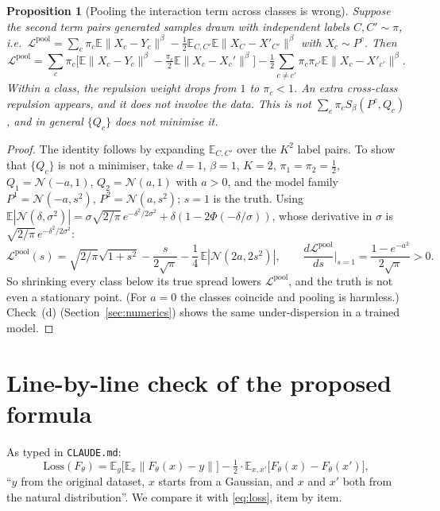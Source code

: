 \documentclass[11pt]{article}
\newtheorem{proposition}[theorem]{Proposition}
\theoremstyle{definition}
\theoremstyle{remark}
\newcommand{\E}{\mathbb{E}}
\newcommand{\N}{\mathcal{N}}
\newcommand{\norm}[1]{\lVert #1\rVert}
\newcommand{\Sb}{S_\beta}
\begin{document}
\begin{proposition}[Pooling the interaction term across classes is wrong]\label{prop:pool}
Suppose the second term pairs generated samples drawn with \emph{independent} labels $C,C'\sim\pi$, i.e.\
$\mathcal L^{\mathrm{pool}}=\sum_c\pi_c\E\norm{X_c-Y_c}^\beta-\tfrac12\E_{C,C'}\E\norm{X_C-X'_{C'}}^\beta$ with
$X_c\sim P^c$. Then
\[
\mathcal L^{\mathrm{pool}}=\sum_c\pi_c\Big[\E\norm{X_c-Y_c}^\beta-\tfrac{\pi_c}{2}\E\norm{X_c-X_c'}^\beta\Big]
-\tfrac12\sum_{c\neq c'}\pi_c\pi_{c'}\E\norm{X_c-X'_{c'}}^\beta .
\]
Within a class, the repulsion weight drops from $1$ to $\pi_c<1$. An extra cross-class repulsion appears,
and it does not involve the data. This is not $\sum_c\pi_c\Sb(P^c,Q_c)$, and in general $\{Q_c\}$ does not
minimise it.
\end{proposition}
\begin{proof}
The identity follows by expanding $\E_{C,C'}$ over the $K^2$ label pairs. To show that $\{Q_c\}$ is not a
minimiser, take $d=1$, $\beta=1$, $K=2$, $\pi_1=\pi_2=\tfrac12$, $Q_1=\N(-a,1)$, $Q_2=\N(a,1)$ with $a>0$, and
the model family $P^1=\N(-a,s^2)$, $P^2=\N(a,s^2)$; $s=1$ is the truth. Using
$\E|\N(\delta,\sigma^2)|=\sigma\sqrt{2/\pi}\,e^{-\delta^2/2\sigma^2}+\delta(1-2\Phi(-\delta/\sigma))$, whose
derivative in $\sigma$ is $\sqrt{2/\pi}\,e^{-\delta^2/2\sigma^2}$:
\[
\mathcal L^{\mathrm{pool}}(s)=\sqrt{2/\pi}\sqrt{1+s^2}-\frac{s}{2\sqrt\pi}-\frac14\,\E|\N(2a,2s^2)|,\qquad
\frac{d\mathcal L^{\mathrm{pool}}}{ds}\Big|_{s=1}=\frac{1-e^{-a^2}}{2\sqrt\pi}>0 .
\]
So shrinking every class below its true spread lowers $\mathcal L^{\mathrm{pool}}$, and the truth is not even a
stationary point. (For $a=0$ the classes coincide and pooling is harmless.) Check~(d)
(Section~\ref{sec:numerics}) shows the same under-dispersion in a trained model.
\end{proof}

\section{Line-by-line check of the proposed formula}\label{sec:check}
As typed in \texttt{CLAUDE.md}:
\begin{equation}\label{eq:user}
\mathrm{Loss}(F_\theta)=\E_y\big[\E_x\norm{F_\theta(x)-y}\big]-\tfrac12\cdot\E_{x,x'}\big[F_\theta(x)-F_\theta(x')\big],
\end{equation}
``$y$ from the original dataset, $x$ starts from a Gaussian, and $x$ and $x'$ both from the natural
distribution''. We compare it with \eqref{eq:loss}, item by item.
\end{document}

